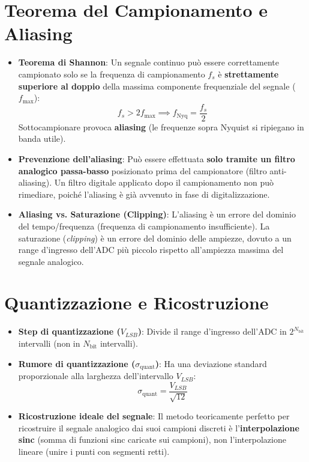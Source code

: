 \documentclass[10pt, letterpaper]{report}
\begin{document}
\section{Teorema del Campionamento e Aliasing}
\begin{itemize}
    \item \textbf{Teorema di Shannon}: Un segnale continuo può essere correttamente campionato solo se la frequenza di campionamento \(f_s\) è \textbf{strettamente superiore al doppio} della massima componente frequenziale del segnale (\(f_{\max}\)):
    \[
    f_s > 2 f_{\max} \implies f_{\text{Nyq}} = \frac{f_s}{2}
    \]
    Sottocampionare provoca \textbf{aliasing} (le frequenze sopra Nyquist si ripiegano in banda utile).
    \item \textbf{Prevenzione dell'aliasing}: Può essere effettuata \textbf{solo tramite un filtro analogico passa-basso} posizionato prima del campionatore (filtro anti-aliasing). Un filtro digitale applicato dopo il campionamento non può rimediare, poiché l'aliasing è già avvenuto in fase di digitalizzazione.
    \item \textbf{Aliasing vs. Saturazione (Clipping)}: L'aliasing è un errore del dominio del tempo/frequenza (frequenza di campionamento insufficiente). La saturazione (\emph{clipping}) è un errore del dominio delle ampiezze, dovuto a un range d'ingresso dell'ADC più piccolo rispetto all'ampiezza massima del segnale analogico.
\end{itemize}

\section{Quantizzazione e Ricostruzione}
\begin{itemize}
    \item \textbf{Step di quantizzazione (\(V_{LSB}\))}: Divide il range d'ingresso dell'ADC in \(2^{N_{\text{bit}}}\) intervalli (non in \(N_{\text{bit}}\) intervalli).
    \item \textbf{Rumore di quantizzazione (\(\sigma_{\text{quant}}\))}: Ha una deviazione standard proporzionale alla larghezza dell'intervallo \(V_{LSB}\):
    \[
    \sigma_{\text{quant}} = \frac{V_{LSB}}{\sqrt{12}}
    \]
    \item \textbf{Ricostruzione ideale del segnale}: Il metodo teoricamente perfetto per ricostruire il segnale analogico dai suoi campioni discreti è l'\textbf{interpolazione sinc} (somma di funzioni sinc caricate sui campioni), non l'interpolazione lineare (unire i punti con segmenti retti).
\end{itemize}
\end{document}
